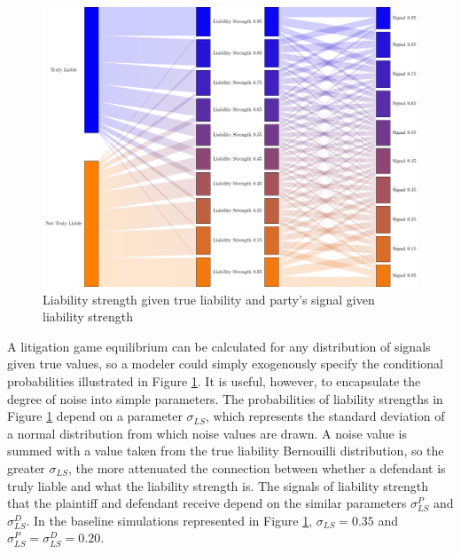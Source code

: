 \documentclass{article}
\begin{document}
\begin{figure}[h!]
\centering
\includegraphics[scale=0.4, trim={0in 0in 0in 0in}, clip]{../Figures/liability signals default.pdf}
\caption{Liability strength given true liability and party's signal given liability strength}
\label{fig:liabilitysignalsdefault}
\end{figure}


A litigation game equilibrium can be calculated for any distribution of signals given true values, so a modeler could simply exogenously specify the conditional probabilities illustrated in Figure \ref{fig:liabilitysignalsdefault}. It is useful, however, to encapsulate the degree of noise into simple parameters. The probabilities of liability strengths in Figure \ref{fig:liabilitysignalsdefault} depend on a parameter $\sigma_{LS}$, which represents the standard deviation of a normal distribution from which noise values are drawn. A noise value is summed with a value taken from the true liability Bernouilli distribution, so the greater $\sigma_{LS}$, the more attenuated the connection between whether a defendant is truly liable and what the liability strength is. The signals of liability strength that the plaintiff and defendant receive depend on the similar parameters $\sigma_{LS}^P$ and $\sigma_{LS}^D$. In the baseline simulations represented in Figure \ref{fig:liabilitysignalsdefault}, $\sigma_{LS}=0.35$ and $\sigma_{LS}^P=\sigma_{LS}^D=0.20$.
\end{document}
